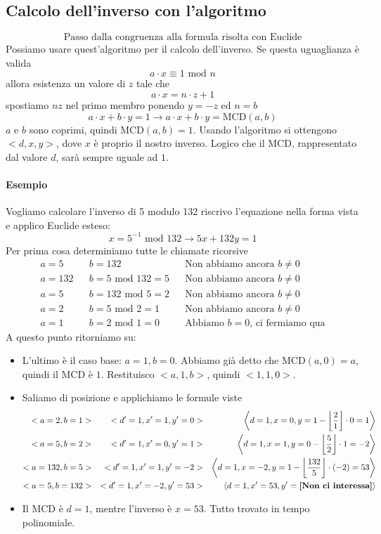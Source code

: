\subsection{Calcolo dell'inverso con l'algoritmo} 
\[\boxed{\text{Passo dalla congruenza alla formula risolta con Euclide}}\]
Possiamo usare quest'algoritmo per il calcolo dell'inverso. Se questa uguaglianza è valida 
$$ a\cdot x \equiv 1 \text{ mod } n $$
allora esistenza un valore di $z$ tale che
$$ a\cdot x = n \cdot z + 1$$
spostiamo $nz$ nel primo membro ponendo $y=-z$ ed $n=b$
$$ a\cdot x + b \cdot y = 1 \longrightarrow  a\cdot x + b \cdot y=\text{MCD}(a,b)$$
$a$ e $b$ sono coprimi, quindi $\text{MCD}(a,b)=1$. Usando l'algoritmo si ottengono $<d, x, y>$, dove $x$ è proprio il nostro inverso. Logico che il MCD, rappresentato dal valore $d$, sarà sempre uguale ad $1$.
\paragraph{Esempio} Vogliamo calcolare l'inverso di 5 modulo 132 riscrivo l'equazione nella forma vista e applico Euclide esteso:
$$x = 5^{-1}\text{ mod }132 \longrightarrow 5x+132y=1$$
Per prima cosa determiniamo tutte le chiamate ricorsive
\begin{align*}
	a=5&& b=132&& \text{Non abbiamo ancora $b \neq 0$}\\
	a=132&& b=5 \text { mod } 132 = 5 && \text{Non abbiamo ancora $b \neq 0$}\\
	a=5&& b = 132 \text { mod } 5 = 2&& \text{Non abbiamo ancora $b \neq 0$}\\
	a= 2&& b = 5 \text{ mod } 2=1&& \text{Non abbiamo ancora $b \neq 0$}\\
	a=1&& b = 2 \text { mod } 1 = 0&& \text{Abbiamo $b = 0$, ci fermiamo qua}
\end{align*} 
A questo punto ritorniamo su:
\begin{itemize}
	\item L'ultimo è il caso base: $a=1, b=0$. Abbiamo già detto che $\text{MCD}(a,0)=a$, quindi il MCD è $1$. Restituisco $<a, 1, b>$, quindi $<1,1,0>$.
	\item Saliamo di posizione e applichiamo le formule viste
	\begin{align*}<a=2,b=1> &&<d'=1,x'=1,y'=0> && \left<d=1,x=0,y= 1- \left\lfloor\frac{2}{1}\right\rfloor\cdot 0 =1\right>\\
		<a=5,b=2> &&<d'=1,x'=0,y'=1> && \left<d=1,x=1,y= 0- \left\lfloor\frac{5}{2}\right\rfloor\cdot 1=-2 \right>\\
		<a=132,b=5> &&<d'=1,x'=1,y'=-2> && \left<d=1,x=-2,y= 1- \left\lfloor\frac{132}{5}\right\rfloor\cdot (-2)=53 \right>\\
		<a=5,b=132> &&<d'=1,x'=-2,y'=53> && \left<d=1, x'=53, y'=\text{\textbf{[Non ci interessa]}}\right>\end{align*}
	\item Il MCD è $d=1$, mentre l'inverso è $x=53$. Tutto trovato in tempo polinomiale.
\end{itemize}


